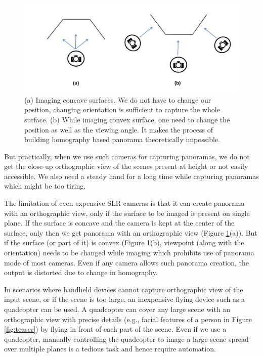 \begin{figure}[htb]
\centering
\includegraphics[width=\textwidth]{figures/multiplanar/ConcaveConvex}
\caption[Imaging concave surfaces versus convex surfaces ]{(a) Imaging concave
surfaces. We do not have to change our position, changing orientation is
sufficient to capture the whole surface. (b) While imaging convex surface, one
need to change the position as well as the viewing angle. It makes the process
of building homography based panorama  theoretically impossible.}
\label{fig:convex_concave}
\end{figure}

But practically, when we use such cameras for capturing panoramas, we do not
get the close-up orthographic view of the scenes present at height or not
easily accessible. We also need a steady hand for a long time while capturing
panoramas which might be too tiring.

The limitation of even expensive SLR cameras is that it can create panorama with
an orthographic view, only if the surface to be imaged is present on single
plane. If the surface is concave and the camera is kept at the center of the
surface, only then we get panorama with an orthographic view (Figure
\ref{fig:convex_concave}(a)). But if the surface (or part of it) is convex (Figure \ref{fig:convex_concave}(b),
 viewpoint (along with the orientation) needs to be changed while imaging which
 prohibits use of panorama mode of most cameras. Even if any camera allows such panorama creation, the output
is distorted due to change in homography. 

In scenarios where handheld devices cannot capture orthographic view of the
input scene, or if the scene is too large, an inexpensive flying device such as
a quadcopter can be used. A quadcopter can cover any large scene with
an orthographic view with precise details (e.g., facial features of a person in
Figure \ref{fig:teaser}) by flying in front of each part of the scene.
Even if we use a quadcopter, manually controlling the quadcopter to image a
large scene spread over multiple planes is a tedious task and hence require
automation.

